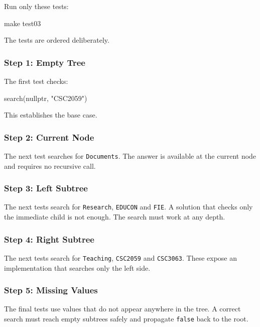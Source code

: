\documentclass{csc2059practical}
\begin{document}
Run only these tests:

\begin{terminal}
make test03
\end{terminal}

The tests are ordered deliberately.

\subsubsection*{Step 1: Empty Tree}

The first test checks:

\begin{cppcode}
search(nullptr, "CSC2059")
\end{cppcode}

This establishes the base case.

\subsubsection*{Step 2: Current Node}

The next test searches for \texttt{Documents}. The answer is available at the
current node and requires no recursive call.

\subsubsection*{Step 3: Left Subtree}

The next tests search for \texttt{Research}, \texttt{EDUCON} and \texttt{FIE}.
A solution that checks only the immediate child is not enough. The search must
work at any depth.

\subsubsection*{Step 4: Right Subtree}

The next tests search for \texttt{Teaching}, \texttt{CSC2059} and
\texttt{CSC3063}. These expose an implementation that searches only the left
side.

\subsubsection*{Step 5: Missing Values}

The final tests use values that do not appear anywhere in the tree. A correct
search must reach empty subtrees safely and propagate
\texttt{false} back to the root.
\end{document}
